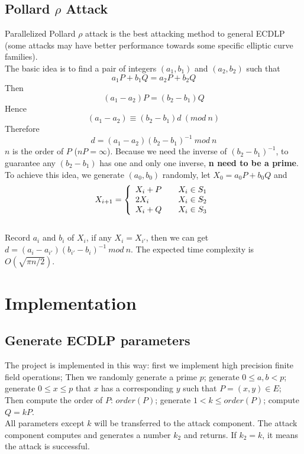 \documentclass[10pt,a4paper]{article}
\begin{document}
\subsection{Pollard $\rho$ Attack}
\indent Parallelized Pollard $\rho$ attack is the best attacking method to general ECDLP (some attacks may have better performance towards some  specific elliptic curve families)\cite{CERTICOM}. \\ 
\indent The basic idea is to find a pair of integers $(a_1, b_1)$ and $(a_2, b_2)$ such that $$a_1P + b_1Q = a_2P + b_2Q$$
Then $$(a_1 - a_2)P = (b_2 - b_1)Q$$
Hence $$(a_1 - a_2) \equiv (b_2 - b_1)d\ (mod\ n)$$
Therefore $$d = (a_1 - a_2)(b_2 - b_1)^{-1}\ mod\ n$$
$n$ is the order of $P$ ($nP = \infty$). Because we need the inverse of $(b_2 - b_1)^{-1}$, to guarantee any $(b_2 - b_1)$ has one and only one inverse, \textbf{n need to be a prime}.\\ 
\indent To achieve this idea, we generate $(a_0, b_0)$ randomly, let $X_0 = a_0P + b_0Q$ and  
$$X_{i+1} = \left\{
	\begin{array}{l l}
    	X_i + P & \quad X_i \in S_1\\
    	2X_i & \quad X_i \in S_2\\
    	X_i + Q & \quad X_i \in S_3
  	\end{array} \right.$$\\
Record $a_i$ and $b_i$ of $X_i$, if any $X_i = X_{i'}$, then we can get $d = (a_i - a_{i'})(b_{i'} - b_i)^{-1}\ mod\ n$. The expected time complexity is $O(\sqrt{\pi n / 2})$\cite{escott.ps}. 

\section{Implementation}
\subsection{Generate ECDLP parameters}
\indent The project is implemented in this way: first we implement high precision finite field operations; Then we randomly generate a prime $p$; generate $0 \leqslant a, b < p$; generate $0 \leqslant x \leq p$ that $x$ has a corresponding $y$ such that $P = (x, y) \in E$; Then compute the order of $P$: $order(P)$; generate $1 < k \leq order(P)$; compute $Q = kP$. \\
\indent All parameters except $k$ will be transferred to the attack component. The attack component computes and generates a number $k_2$ and returns. If $k_2 = k$, it means the attack is successful.
\end{document}
